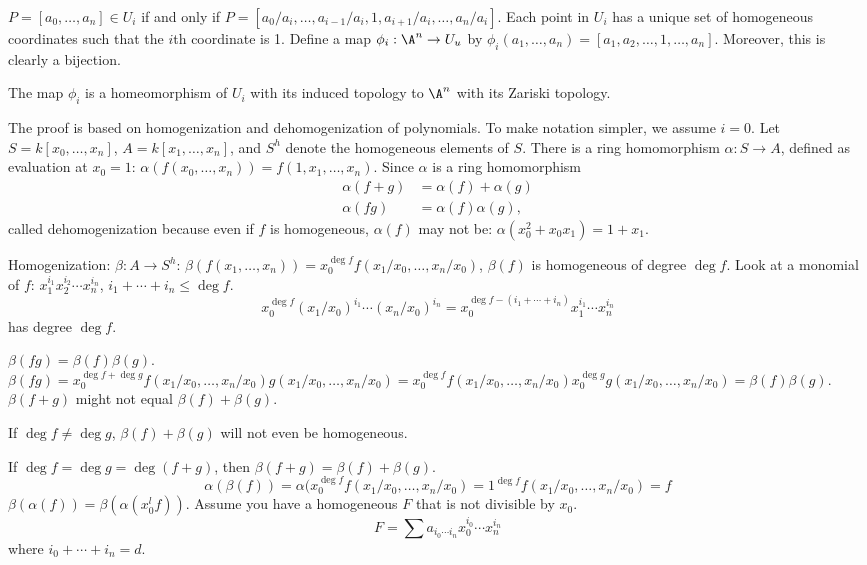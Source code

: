 
$P= [a_0,\ldots,a_n] \in U_i$ if and only if $P= [a_0/a_i,\ldots,a_{i-1}/a_i,1,a_{i+1}/a_i,\ldots,a_n/a_i]$. Each point in $U_i$ has a unique set of homogeneous coordinates such that the $i$th coordinate is 1. Define a map $\phi_i: \A^n \to U_u$  by $\phi_i(a_1,\ldots,a_n)= [a_1,a_2,\ldots,1,\ldots,a_n]$. Moreover, this is clearly a bijection. 



\begin{prop}
The map $\phi_i$ is a homeomorphism of $U_i$ with its induced topology to $\A^n$ with its Zariski topology. 
\end{prop}

The proof is based on homogenization and dehomogenization of polynomials. To make notation simpler, we assume $i=0$. Let $S= k[x_0,\ldots,x_n]$, $A= k[x_1,\ldots,x_n]$, and $S^h$ denote the homogeneous elements of $S$. There is a ring homomorphism $\alpha: S \to A$, defined as evaluation at $x_0= 1$: $\alpha(f(x_0,\ldots,x_n))= f(1,x_1,\ldots,x_n)$. Since $\alpha$ is a ring homomorphism
	\[
	\begin{split}
	\alpha(f+g)&= \alpha(f)+\alpha(g) \\
	\alpha(fg)&= \alpha(f)\alpha(g),
	\end{split}
	\]
called dehomogenization because even if $f$ is homogeneous, $\alpha(f)$ may not be: $\alpha(x_0^2+x_0x_1)= 1+x_1$. 


Homogenization: $\beta: A \to S^h$: $\beta(f(x_1,\ldots,x_n))= x_0^{\deg f} f(x_1/x_0,\ldots,x_n/x_0)$, $\beta(f)$ is homogeneous of degree $\deg f$. Look at a monomial of $f$: $x_1^{i_1} x_2^{i_2} \cdots x_n^{i_n}$, $i_1+\cdots+i_n \leq \deg f$.
	\[
	x_0^{\deg f} (x_1/x_0)^{i_1} \cdots (x_n/x_0)^{i_n}= x_0^{\deg f - (i_1+\cdots+i_n)} x_1^{i_1} \cdots x_n^{i_n}
	\]
has degree $\deg f$.


$\beta(fg)= \beta(f) \beta(g)$.
$\beta(fg)= x_0^{\deg f + \deg g} f(x_1/x_0,\ldots,x_n/x_0) g(x_1/x_0,\ldots,x_n/x_0)= x_0^{\deg f} f(x_1/x_0,\ldots,x_n/x_0) x_0^{\deg g} g(x_1/x_0,\ldots,x_n/x_0)= \beta(f) \beta(g)$. $\beta(f+g)$ might not equal $\beta(f) + \beta(g)$. 

If $\deg f \neq \deg g$, $\beta(f) + \beta(g)$ will not even be homogeneous. 

If $\deg f= \deg g= \deg(f+g)$, then $\beta(f+g)= \beta(f) + \beta(g)$. 
	\[
	\alpha(\beta(f))= \alpha(x_0^{\deg f} f(x_1/x_0,\ldots,x_n/x_0)= 1^{\deg f} f(x_1/x_0,\ldots,x_n/x_0)= f
	\]
$\beta(\alpha(f))= \beta(\alpha(x_0^l f))$. Assume you have a homogeneous $F$ that is not divisible by $x_0$.
	\[
	F= \sum a_{i_0 \cdots i_n} x_0^{i_0} \cdots x_n^{i_n}
	\]
where $i_0 + \cdots + i_n= d$. 


